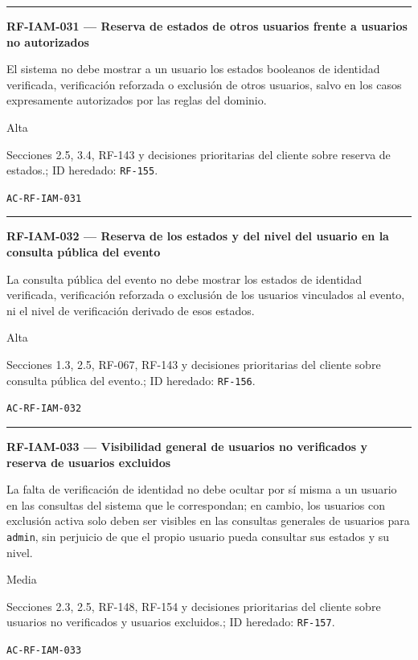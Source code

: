 \documentclass[10pt,letterpaper]{article}
\begin{document}
\vspace{0.25em}\hrule\vspace{0.65em}
\noindent\textbf{RF-IAM-031 --- Reserva de estados de otros usuarios frente a usuarios no autorizados}\par
\begin{description}[style=nextline,leftmargin=3.15cm,labelwidth=2.8cm,font=\normalfont\bfseries]
\item[Obligación] El sistema no debe mostrar a un usuario los estados booleanos de identidad verificada, verificación reforzada o exclusión de otros usuarios, salvo en los casos expresamente autorizados por las reglas del dominio.
\item[Prioridad] Alta
\item[Procedencia] Secciones 2.5, 3.4, RF-143 y decisiones prioritarias del cliente sobre reserva de estados.; ID heredado: \texttt{RF-155}.
\item[Verificación] \texttt{AC-RF-IAM-031}
\end{description}
\vspace{0.25em}\hrule\vspace{0.65em}
\noindent\textbf{RF-IAM-032 --- Reserva de los estados y del nivel del usuario en la consulta pública del evento}\par
\begin{description}[style=nextline,leftmargin=3.15cm,labelwidth=2.8cm,font=\normalfont\bfseries]
\item[Obligación] La consulta pública del evento no debe mostrar los estados de identidad verificada, verificación reforzada o exclusión de los usuarios vinculados al evento, ni el nivel de verificación derivado de esos estados.
\item[Prioridad] Alta
\item[Procedencia] Secciones 1.3, 2.5, RF-067, RF-143 y decisiones prioritarias del cliente sobre consulta pública del evento.; ID heredado: \texttt{RF-156}.
\item[Verificación] \texttt{AC-RF-IAM-032}
\end{description}
\vspace{0.25em}\hrule\vspace{0.65em}
\noindent\textbf{RF-IAM-033 --- Visibilidad general de usuarios no verificados y reserva de usuarios excluidos}\par
\begin{description}[style=nextline,leftmargin=3.15cm,labelwidth=2.8cm,font=\normalfont\bfseries]
\item[Obligación] La falta de verificación de identidad no debe ocultar por sí misma a un usuario en las consultas del sistema que le correspondan; en cambio, los usuarios con exclusión activa solo deben ser visibles en las consultas generales de usuarios para \texttt{admin}, sin perjuicio de que el propio usuario pueda consultar sus estados y su nivel.
\item[Prioridad] Media
\item[Procedencia] Secciones 2.3, 2.5, RF-148, RF-154 y decisiones prioritarias del cliente sobre usuarios no verificados y usuarios excluidos.; ID heredado: \texttt{RF-157}.
\item[Verificación] \texttt{AC-RF-IAM-033}
\end{description}
\end{document}
